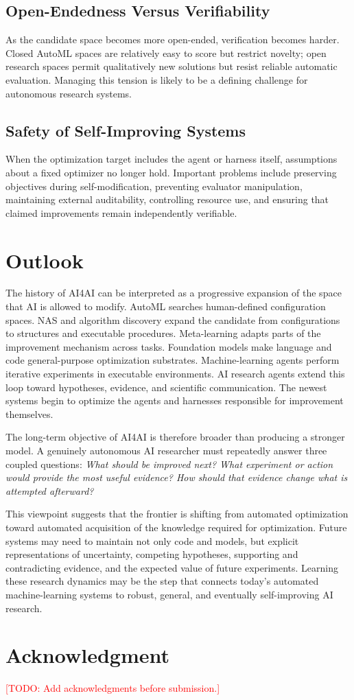 \documentclass[journal]{IEEEtran}
\newcommand{\TODO}[1]{\textcolor{red}{[TODO: #1]}}
\begin{document}
\subsection{Open-Endedness Versus Verifiability}
As the candidate space becomes more open-ended, verification becomes harder. Closed AutoML spaces are relatively easy to score but restrict novelty; open research spaces permit qualitatively new solutions but resist reliable automatic evaluation. Managing this tension is likely to be a defining challenge for autonomous research systems.

\subsection{Safety of Self-Improving Systems}
When the optimization target includes the agent or harness itself, assumptions about a fixed optimizer no longer hold. Important problems include preserving objectives during self-modification, preventing evaluator manipulation, maintaining external auditability, controlling resource use, and ensuring that claimed improvements remain independently verifiable.

\section{Outlook}
\label{sec:outlook}

The history of AI4AI can be interpreted as a progressive expansion of the space that AI is allowed to modify. AutoML searches human-defined configuration spaces. NAS and algorithm discovery expand the candidate from configurations to structures and executable procedures. Meta-learning adapts parts of the improvement mechanism across tasks. Foundation models make language and code general-purpose optimization substrates. Machine-learning agents perform iterative experiments in executable environments. AI research agents extend this loop toward hypotheses, evidence, and scientific communication. The newest systems begin to optimize the agents and harnesses responsible for improvement themselves.

The long-term objective of AI4AI is therefore broader than producing a stronger model. A genuinely autonomous AI researcher must repeatedly answer three coupled questions: \emph{What should be improved next? What experiment or action would provide the most useful evidence? How should that evidence change what is attempted afterward?}

This viewpoint suggests that the frontier is shifting from automated optimization toward automated acquisition of the knowledge required for optimization. Future systems may need to maintain not only code and models, but explicit representations of uncertainty, competing hypotheses, supporting and contradicting evidence, and the expected value of future experiments. Learning these research dynamics may be the step that connects today's automated machine-learning systems to robust, general, and eventually self-improving AI research.

\section*{Acknowledgment}
\TODO{Add acknowledgments before submission.}



\end{document}
